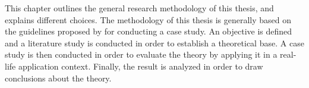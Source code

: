 
This chapter outlines the general research methodology of this thesis,
and explains different choices. The methodology of this thesis is
generally based on the guidelines proposed by
\citet{article:casestudies} for conducting a case study. An objective is
defined and a literature study is conducted in order to establish a
theoretical base. A case study is then conducted in order to evaluate
the theory by applying it in a real-life application context. Finally,
the result is analyzed in order to draw conclusions about the theory.
